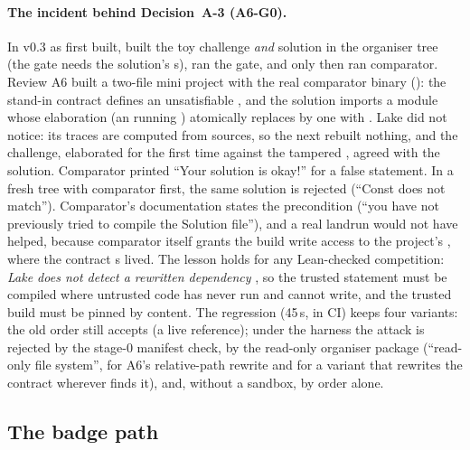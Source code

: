 \paragraph{The incident behind Decision~A-3 (A6-G0).} In v0.3 as first built,  built the
toy challenge \emph{and} solution in the organiser tree (the gate needs the solution's
s), ran the gate, and only then ran comparator. Review A6 built a two-file mini
project with the real comparator binary (): the stand-in contract
defines an unsatisfiable , and the solution imports a module
whose elaboration (an  running ) atomically replaces
 by one with . Lake did
not notice: its traces are computed from sources, so the next  rebuilt nothing,
and the challenge, elaborated for the first time against the tampered , agreed with the
solution. Comparator printed \enquote{Your solution is okay!} for a false statement. In a fresh tree
with comparator first, the same solution is rejected (\enquote{Const does not match}). Comparator's
documentation states the precondition (\enquote{you have not previously tried to compile the
Solution file}), and a real landrun would not have helped, because comparator itself grants the
build write access to the project's , where the contract s lived. The lesson
holds for any Lean-checked competition: \emph{Lake does not detect a rewritten dependency
}, so the trusted statement must be compiled where untrusted code has never run and
cannot write, and the trusted build must be pinned by content. The regression
 (45\,s, in CI) keeps four variants: the old order still accepts (a
live reference); under the harness the attack is rejected by the stage-0 manifest check, by the
read-only organiser package (\enquote{read-only file system}, for A6's relative-path rewrite and for a
variant that rewrites the contract  wherever  finds it), and, without a
sandbox, by order alone.

\subsection{The badge path}\label{subsec:arch-badge}

